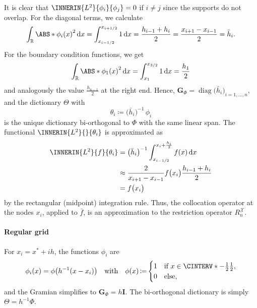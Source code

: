 \documentclass[a4paper]{paper}
\newcommand*{\SPC}[1]{{\ensuremath{\mathscr{#1}}}}
\newcommand{\RR}{{\ensuremath{\mathbb{R}}}}
\newcommand*{\REST}[2]{\ensuremath{R_{#1}^{#2}}}
\newcommand*{\RnX}{{\ensuremath{\REST{n}{\SPC{X}}}}}
\DeclareMathOperator{\DIAG}{{diag}}
\DeclareMathOperator{\DEFEQ}{{\coloneqq}}
\newcommand*{\D}{{\ensuremath{\mathrm{d}}}}
\newcommand*{\BDG}{\boldsymbol{G}}
\newcommand*{\BDI}{\boldsymbol{I}}
\begin{document}
It is clear that $\INNERIN{L^2}{\phi_i}{\phi_j} = 0$ if $i \neq j$ since the supports do not overlap. For 
the diagonal terms, we calculate
%
\begin{equation*}
 \int_\RR \ABS*{\phi_i(x)}^2\, \D x 
 = \int_{x_{i-1/2}}^{x_{i+1/2}} 1\, \D x
 = \frac{h_{i-1} + h_i}{2} = \frac{x_{i+1} - x_{i-1}}{2}
 = \bar h_i.
\end{equation*}
%
For the boundary condition functions, we get
%
\begin{equation*}
 \int_\RR \ABS*{\phi_1(x)}^2\, \D x 
 = \int_{x_1}^{x_{3/2}} 1\, \D x
 = \frac{h_1}{2}
\end{equation*}
%
and analogously the value $\frac{h_{n-1}}{2}$ at the right end.
%
Hence, $\BDG_\Phi = \DIAG\big( \bar h_i \big)_{i=1,\dots,n}$, and the dictionary $\Theta$ with
%
\begin{equation*}
 \theta_i \DEFEQ \big( \bar h_i \big)^{-1}\, \phi_i
\end{equation*}
%
is the unique dictionary bi-orthogonal to $\Phi$ with the same linear span. The functional 
$\INNERIN{L^2}{}{\theta_i}$ is approximated as
%
\begin{align*}
 \INNERIN{L^2}{f}{\theta_i}
 &= \big( \bar h_i \big)^{-1} \int_{x_{i-1/2}}^{x_i + 
 \frac{h_i}{2}} f(x)\, \D x \\
 &\approx  \frac{2}{x_{i+1} - x_{i-1}} f\big( x_i \big) \frac{h_{i-1} + h_i}{2} 
 \\
 &= f\big( x_i \big)
\end{align*}
%
by the rectangular (midpoint) integration rule. Thus, the collocation operator at the nodes $x_i$, applied to 
$\bar f$, is an approximation to the restriction operator $\RnX$.

\paragraph{Regular grid}

For $x_i = x^* + i h$, the functions $\phi_i$ are
%
\begin{equation*}
 \phi_i(x) = \phi\big( h^{-1}(x-x_i) \big)
 \quad \text{with} \quad
 \phi(x) \DEFEQ
 \begin{cases}
  1 & \text{if } x \in \CINTERV*{-\tfrac{1}{2}}{\tfrac{1}{2}}, \\
  0 & \text{else},
 \end{cases}
\end{equation*}
%
and the Gramian simplifies to $\BDG_\Phi = h \BDI$. The bi-orthogonal dictionary is simply $\Theta = h^{-1}\Phi$.
\end{document}
